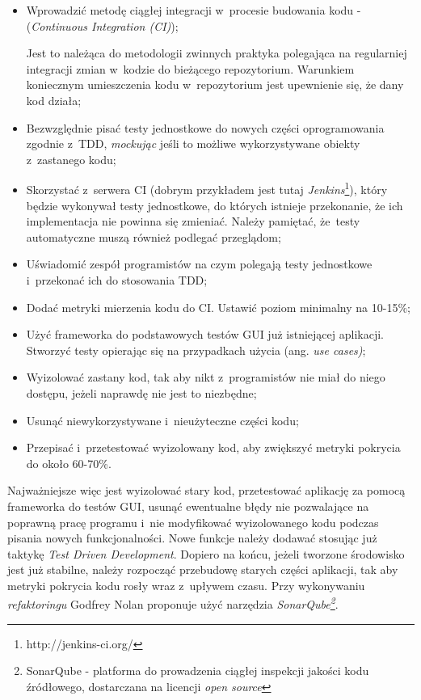\begin{itemize}
\item 
Wprowadzić metodę ciągłej integracji w~procesie budowania kodu -  (\textit{Continuous Integration (CI)});

Jest to należąca do metodologii zwinnych praktyka polegająca na regularniej integracji zmian w~kodzie do bieżącego repozytorium. Warunkiem koniecznym umieszczenia kodu w~repozytorium jest upewnienie się, że dany kod działa;

\item
Bezwzględnie pisać testy jednostkowe do nowych części oprogramowania zgodnie z~TDD, \textit{mockując} jeśli to możliwe wykorzystywane obiekty z~zastanego kodu;

\item
Skorzystać z~serwera CI (dobrym przykładem jest tutaj \textit{Jenkins}\footnote{http://jenkins-ci.org/}), który będzie wykonywał testy jednostkowe, do których istnieje przekonanie, że ich implementacja nie powinna się zmieniać. Należy pamiętać, że~testy automatyczne muszą również podlegać przeglądom;

\item
Uświadomić zespół programistów na czym polegają testy jednostkowe i~przekonać ich do stosowania TDD;

\item
Dodać metryki mierzenia kodu do CI. Ustawić poziom minimalny na 10-15\%;

\item
Użyć frameworka do podstawowych testów GUI już istniejącej aplikacji. Stworzyć testy opierając się na przypadkach użycia (ang. \textit{use cases)};

\item
Wyizolować zastany kod, tak aby nikt z~programistów nie miał do niego dostępu, jeżeli naprawdę nie jest to niezbędne;

\item
Usunąć niewykorzystywane i~nieużyteczne części kodu;

\item
Przepisać i~przetestować wyizolowany kod, aby zwiększyć metryki pokrycia do około 60-70\%. 
\end{itemize}

Najważniejsze więc jest wyizolować stary kod, przetestować aplikację za pomocą frameworka do testów GUI, usunąć ewentualne błędy nie pozwalające na poprawną pracę programu i~nie modyfikować wyizolowanego kodu podczas pisania nowych funkcjonalności. Nowe funkcje należy dodawać stosując już taktykę \textit{Test Driven Development}. Dopiero na końcu, jeżeli tworzone środowisko jest już stabilne, należy rozpocząć przebudowę starych części aplikacji, tak aby metryki pokrycia kodu rosły wraz z~upływem czasu. Przy wykonywaniu \textit{refaktoringu} Godfrey Nolan proponuje użyć narzędzia \textit{SonarQube\footnote{SonarQube - platforma do prowadzenia ciągłej inspekcji jakości kodu źródłowego, dostarczana na licencji \textit{open source}}}.

